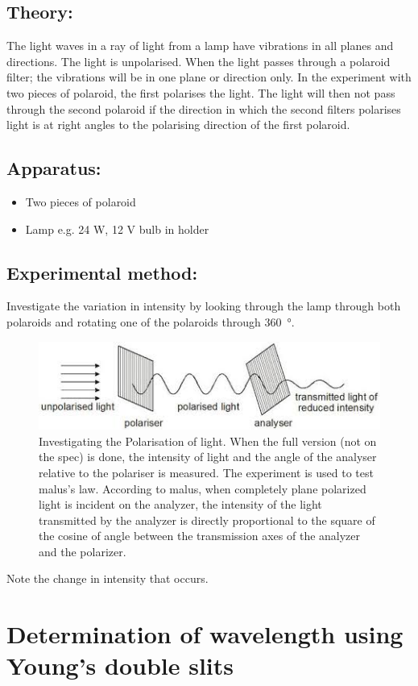 \documentclass{tufte-handout}
\begin{document}
\subsection{Theory:} 
The light waves in a ray of light from a lamp have vibrations in all planes and directions.  The light is unpolarised.  When the light passes through a polaroid filter; the vibrations will be in one plane or direction only.  In the experiment with two pieces of polaroid, the first polarises the light.  The light will then not pass through the second polaroid if the direction in which the second filters polarises light is at right angles to the polarising direction of the first polaroid.
\subsection{Apparatus:} \begin{itemize} 
\item Two pieces of polaroid 
\item Lamp e.g. 24 W, 12 V bulb in holder  
\end{itemize}
\subsection{Experimental method:} 
Investigate the variation in intensity by looking through the lamp through both polaroids and rotating one of the polaroids through \SI{360}{\degree}.
\begin{figure}
\includegraphics[width=\textwidth]{malus.jpg}
\caption{Investigating the Polarisation of light. When the full version (not on the spec) is done, the intensity of light and the angle of the analyser relative to the polariser is measured. The experiment is used to test malus's law. According to malus, when completely plane polarized light is incident on the analyzer, the intensity of the light transmitted by the analyzer is directly proportional to the square of the cosine of angle between the transmission axes of the analyzer and the polarizer.}
\end{figure} 
Note the change in intensity that occurs. 
\section{Determination of wavelength using Young's double slits}
\end{document}
